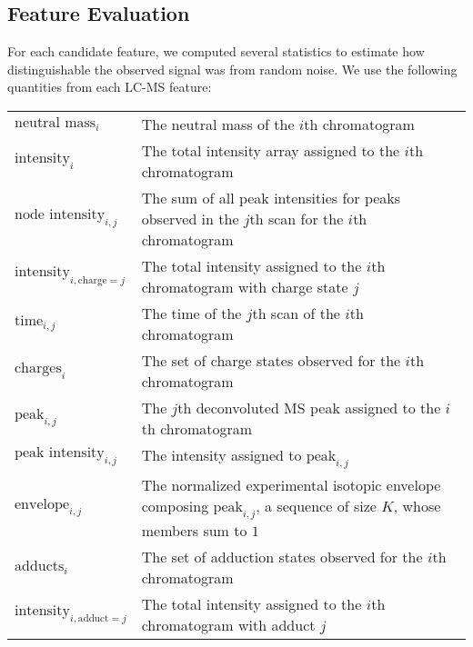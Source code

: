 \documentclass{article}
\begin{document}
\subsection{Feature Evaluation}
For each candidate feature, we computed several statistics to estimate how distinguishable
the observed signal was from random noise. We use the following quantities from each LC-MS
feature:

\begin{center}
\begin{tabular}{l | p{9cm}}
    \hline
    $\text{neutral mass}_i$ & The neutral mass of the $i$th chromatogram\\
    $\text{intensity}_i$ & The total intensity array assigned to the $i$th chromatogram\\
    $\text{node intensity}_{i, j}$ & The sum of all peak intensities for peaks observed in
                                     the $j$th scan for the $i$th chromatogram\\
    $\text{intensity}_{i, \text{charge}=j}$ & The total intensity assigned to the $i$th
                                              chromatogram with charge state $j$\\
    $\text{time}_{i, j}$ & The time of the $j$th scan of the $i$th chromatogram\\
    $\text{charges}_i$ & The set of charge states observed for the $i$th chromatogram\\
    $\text{peak}_{i, j}$ & The $j$th deconvoluted MS peak assigned to the $i$th chromatogram\\
    $\text{peak intensity}_{i, j}$ & The intensity assigned to $\text{peak}_{i, j}$\\
    $\text{envelope}_{i, j}$ & The normalized experimental isotopic envelope composing
                               $\text{peak}_{i, j}$, a sequence of size $K$, whose members
                               sum to $1$\\
    $\text{adducts}_i$ & The set of adduction states observed for the $i$th chromatogram\\
    $\text{intensity}_{i, \text{adduct}=j}$ & The total intensity assigned to the $i$th
                                              chromatogram with adduct $j$\\
\end{tabular}
\end{center}
\end{document}
